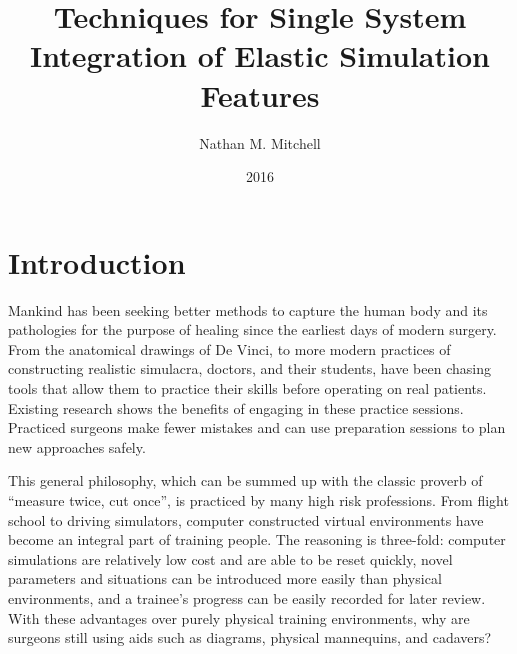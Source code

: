 \documentclass[12pt,oneside,letterpaper]{memoir}
\title{Techniques for Single System Integration of Elastic Simulation Features}
\author{Nathan M. Mitchell}
\date{2016}
\begin{document}

\ifpdf
{}
\else
{}
\fi

\maketitle




\chapter{Introduction}

Mankind has been seeking better methods to capture the human body and
its pathologies for the purpose of healing since the earliest days of
modern surgery. From the anatomical drawings of De Vinci, to more
modern practices of constructing realistic simulacra, doctors, and
their students, have been chasing tools that allow them to practice
their skills before operating on real patients. Existing research
shows the benefits of engaging in these practice
sessions\cite{GallaRCHFMSS:2005}. Practiced surgeons make fewer
mistakes and can use preparation sessions to plan new approaches
safely.

This general philosophy, which can be summed up with the classic
proverb of ``measure twice, cut once'', is practiced by many high risk
professions. From flight school to driving simulators, computer
constructed virtual environments have become an integral part of
training people. The reasoning is three-fold: computer simulations are
relatively low cost and are able to be reset quickly, novel parameters
and situations can be introduced more easily than physical
environments, and a trainee's progress can be easily recorded for
later review. With these advantages over purely physical training
environments, why are surgeons still using aids such as diagrams,
physical mannequins, and cadavers?
\end{document}
